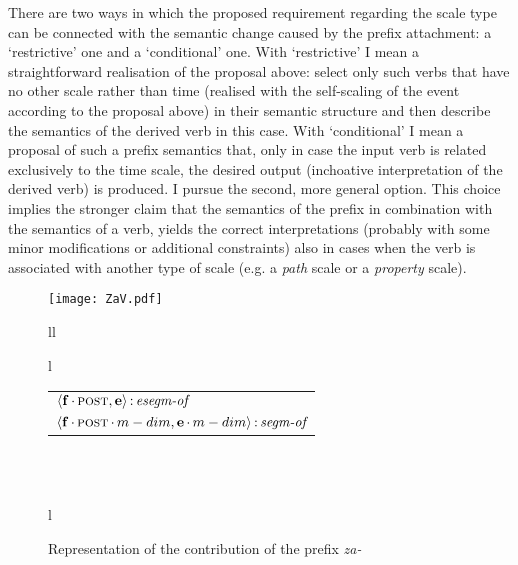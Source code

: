 There are two ways in which the proposed requirement regarding the scale type can be connected with the semantic change caused by the prefix attachment: a `restrictive' one and a `conditional' one. With `restrictive' I mean a straightforward realisation of the proposal above: select only such verbs that have no other scale rather than time (realised with the self-scaling of the event according to the proposal above) in their semantic structure and then describe the semantics of the derived verb in this case. With `conditional' I mean a proposal of such a prefix semantics that, only in case the input verb is related exclusively to the time scale, the desired output (inchoative interpretation of the derived verb) is produced. I pursue the second, more general option. This choice implies the stronger claim that the semantics of the prefix in combination with the semantics of a verb, yields the correct interpretations (probably with some minor modifications or additional constraints) also in cases when the verb is associated with another type of scale (e.g. a \textit{path} scale or a \textit{property} scale). 

\begin{figure}
\centering
\texttt{[image: ZaV.pdf]}\\
\begin{tabular}[t]{ll}
\begin{tabular}[t]{l}
\\
\end{tabular}
\begin{footnotesize}
\begin{tabular}[t]{@{}l@{}}
$\langle{\textbf{\textrm{f}}\,{\cdot}\,\textsc{post},\textbf{\textrm{e}}}\rangle\,{:}\,\textit{esegm-of}$\\[1ex]
$\tuple{\btag{f}\BC\POST\C\MDIM,\btag{e}\BC\MDIM}\D\type{segm-of}$\\
\end{tabular}
\end{footnotesize}
\\\\
\begin{tabular}[t]{l}
\hfill
\end{tabular}
\end{tabular}
\hfill
\caption{Representation of the contribution of the prefix \textit{za-}}
\label{fig.za.frame.semantics}
\end{figure}


